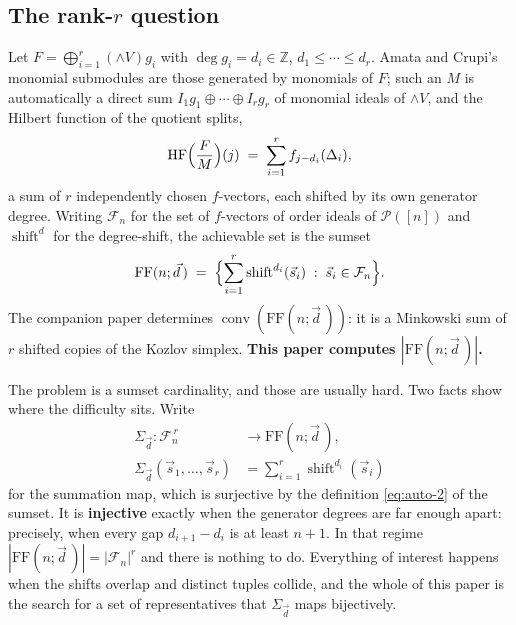 \documentclass[11pt, a4paper, abstract=yes]{scrartcl}
\theoremstyle{definition}
\theoremstyle{remark}
\theoremstyle{plain}
\newcommand{\shift}{\operatorname{shift}}
\newcommand{\conv}{\operatorname{conv}}
\newcommand{\HF}{\operatorname{HF}}
\newcommand{\Ext}{\mathord{\wedge }V}
\begin{document}
\subsection{The rank-\(r\) question}
\label{sec:org5cd0fe2}

Let \(F=\bigoplus_{i=1}^r(\Ext)g_i\) with \(\deg g_i=d_i\in\mathbb Z\), \(d_1\le\cdots\le d_r\). Amata and
Crupi's monomial submodules are those generated by monomials of \(F\); such an \(M\) is automatically
a direct sum \(I_1g_1\oplus\cdots\oplus I_rg_r\) of monomial ideals of \(\Ext\), and the Hilbert function
of the quotient splits,
\begin{equation}\label{eq:auto-1}
  \HF\Bigl(\frac FM\Bigr)(j)\;=\;\sum_{i=1}^{r}f_{j-d_i}(\Delta_i),
\end{equation}
a sum of \(r\) independently chosen \(f\)-vectors, each shifted by its own generator degree. Writing
\(\mathcal F_n\) for the set of \(f\)-vectors of order ideals of \(\mathcal P([n])\) and
\(\shift^d\) for the degree-shift, the achievable set is the sumset
\begin{equation}\label{eq:auto-2}
  \mathrm{FF}(n;\vec d\,)\;=\;\Bigl\lbrace\sum_{i=1}^{r}\shift^{d_i}(\vec s_i)\;:\;\vec s_i\in\mathcal F_n\Bigr\rbrace .
\end{equation}
The companion paper \autocite{SnellmanArticle1} determines \(\conv(\mathrm{FF}(n;\vec d\,))\): it is a Minkowski sum of \(r\) shifted copies
of the Kozlov simplex. \textbf{This paper computes \(|\mathrm{FF}(n;\vec d\,)|\).}

The problem is a sumset cardinality, and those are usually hard. Two facts show where the difficulty
sits. Write
\begin{equation}\label{eq:sumset-map}
\begin{split}
  \Sigma_{\vec d}\colon\mathcal F_n^{\,r} &\longrightarrow \mathrm{FF}(n;\vec d\,),\\
  \Sigma_{\vec d}(\vec s_1,\dots,\vec s_r) &= \sum_{i=1}^{r}\shift^{d_i}(\vec s_i)
\end{split}
\end{equation}
for the summation map, which is surjective by the definition \eqref{eq:auto-2} of the sumset. It is
\textbf{injective} exactly when the generator degrees are far enough apart: precisely, when every gap
\(d_{i+1}-d_i\) is at least \(n+1\). In that regime \(|\mathrm{FF}(n;\vec d\,)|=|\mathcal F_n|^r\) and
there is nothing to do. Everything of interest happens when the shifts overlap and distinct tuples
collide, and the whole of this paper is the search for a set of representatives that
\(\Sigma_{\vec d}\) maps bijectively.
\end{document}

